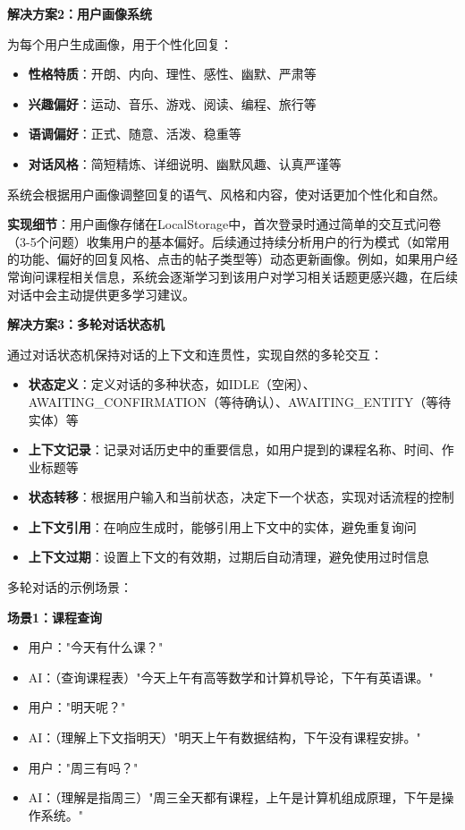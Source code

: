\documentclass[12pt,a4paper]{article}
\begin{document}
\textbf{解决方案2：用户画像系统}

为每个用户生成画像，用于个性化回复：

\begin{itemize}
    \item \textbf{性格特质}：开朗、内向、理性、感性、幽默、严肃等
    \item \textbf{兴趣偏好}：运动、音乐、游戏、阅读、编程、旅行等
    \item \textbf{语调偏好}：正式、随意、活泼、稳重等
    \item \textbf{对话风格}：简短精炼、详细说明、幽默风趣、认真严谨等
\end{itemize}

系统会根据用户画像调整回复的语气、风格和内容，使对话更加个性化和自然。

\textbf{实现细节}：用户画像存储在LocalStorage中，首次登录时通过简单的交互式问卷（3-5个问题）收集用户的基本偏好。后续通过持续分析用户的行为模式（如常用的功能、偏好的回复风格、点击的帖子类型等）动态更新画像。例如，如果用户经常询问课程相关信息，系统会逐渐学习到该用户对学习相关话题更感兴趣，在后续对话中会主动提供更多学习建议。

\textbf{解决方案3：多轮对话状态机}

通过对话状态机保持对话的上下文和连贯性，实现自然的多轮交互：

\begin{itemize}
    \item \textbf{状态定义}：定义对话的多种状态，如IDLE（空闲）、AWAITING\_CONFIRMATION（等待确认）、AWAITING\_ENTITY（等待实体）等
    \item \textbf{上下文记录}：记录对话历史中的重要信息，如用户提到的课程名称、时间、作业标题等
    \item \textbf{状态转移}：根据用户输入和当前状态，决定下一个状态，实现对话流程的控制
    \item \textbf{上下文引用}：在响应生成时，能够引用上下文中的实体，避免重复询问
    \item \textbf{上下文过期}：设置上下文的有效期，过期后自动清理，避免使用过时信息
\end{itemize}

多轮对话的示例场景：

\textbf{场景1：课程查询}
\begin{itemize}
    \item 用户："今天有什么课？"
    \item AI：（查询课程表）"今天上午有高等数学和计算机导论，下午有英语课。"
    \item 用户："明天呢？"
    \item AI：（理解上下文指明天）"明天上午有数据结构，下午没有课程安排。"
    \item 用户："周三有吗？"
    \item AI：（理解是指周三）"周三全天都有课程，上午是计算机组成原理，下午是操作系统。"
\end{itemize}
\end{document}
